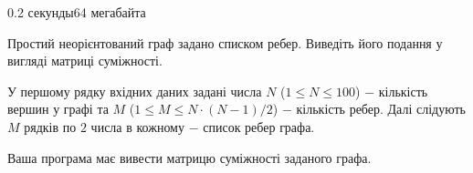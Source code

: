 \begin{problem}{}{}{}{0.2 секунды}{64 мегабайта}

Простий неорієнтований граф задано списком ребер. Виведіть його подання у вигляді матриці суміжності.

\InputFile
У першому рядку вхідних даних задані числа $N$ ($1 \le N \le 100$) $-$ кількість вершин у графі та 
$M$ ($1 \le M \le N\cdot(N-1)/2$) $-$ кількість ребер.
Далі слідують $M$ рядків по $2$ числа в кожному $-$ список ребер графа. 

\OutputFile
Ваша програма має вивести матрицю суміжності заданого графа.

\Example

\begin{example}
%
\end{example}

\end{problem}

